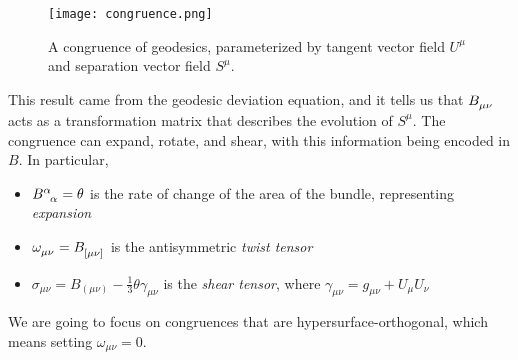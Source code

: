 \documentclass[10pt]{article}
\begin{document}
               		\begin{figure}[!h]
               		\centering
               		\texttt{[image: congruence.png]}
               		\caption{A congruence of geodesics, parameterized by tangent vector field $U^\mu$ and separation vector field $S^\mu$. }
               		\end{figure}
               		
               		This result came from the geodesic deviation equation, and it tells us that $\tensor{B}{_\mu_\nu}$ acts as a transformation matrix that describes the evolution of $S^\mu$. The congruence can expand, rotate, and shear, with this information being encoded in $B$. In particular,
               		\begin{itemize}
               		    \item $\tensor{B}{^\alpha_\alpha} = \theta$ is the rate of change of the area of the bundle, representing \textit{expansion}
               		    \item $\tensor{\omega}{_\mu_\nu} = \tensor{B}{_{[\mu}_{\nu]}}$ is the antisymmetric \textit{twist tensor}
               		    \item $\sigma_{\mu\nu} = B_{(\mu\nu)} - \frac{1}{3}\theta\gamma_{\mu\nu}$ is the \textit{shear tensor}, where $\gamma_{\mu\nu} = g_{\mu\nu} + U_\mu U_\nu$
               		\end{itemize}
               		We are going to focus on congruences that are hypersurface-orthogonal, which means setting $\omega_{\mu\nu} = 0$.
               		
\end{document}
